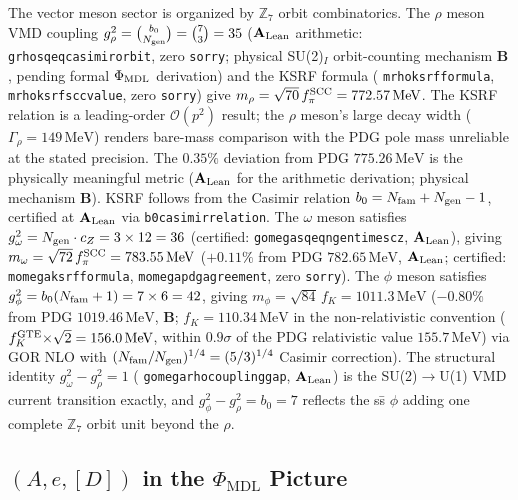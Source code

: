 \documentclass[12pt,letterpaper]{article}
\newcommand{\CatAL}{\ensuremath{\textbf{A}_{\rm Lean}}}
\newcommand{\CatB}{\textbf{B}}
\newcommand{\lean}[1]{%
  \penalty-100
  \begingroup\def\_{\textunderscore\allowbreak}\texttt{#1}\endgroup}
\begin{document}
The vector meson sector is organized by $\mathbb{Z}_7$ orbit combinatorics.
The $\rho$ meson VMD coupling $g_\rho^2 = \binom{b_0}{N_{\rm gen}} = \binom{7}{3} = 35$
($\CatAL$ arithmetic: \lean{g\_rho\_sq\_eq\_casimir\_orbit}, zero \texttt{sorry};
physical SU(2)$_I$ orbit-counting mechanism $\CatB$, pending formal $\Phi_{\rm MDL}$
derivation) and the KSRF formula (\lean{m\_rho\_ksrf\_formula},
\lean{m\_rho\_ksrf\_scc\_value}, zero \texttt{sorry}) give
$m_\rho = \sqrt{70}\,f_\pi^{\rm SCC} = 772.57\,\mathrm{MeV}$.
The KSRF relation is a leading-order $\mathcal{O}(p^2)$ result; the $\rho$ meson's
large decay width ($\Gamma_\rho = 149\,\mathrm{MeV}$) renders bare-mass comparison
with the PDG pole mass unreliable at the stated precision.
The $0.35\%$ deviation from PDG $775.26\,\mathrm{MeV}$ is the physically
meaningful metric ($\CatAL$ for the arithmetic derivation; physical mechanism $\CatB$).
KSRF follows from the Casimir relation $b_0 = N_{\rm fam} + N_{\rm gen} - 1$,
certified at $\CatAL$ via \lean{b0\_casimir\_relation}.
The $\omega$ meson satisfies $g_\omega^2 = N_{\rm gen} \cdot c_Z = 3 \times 12 = 36$
(certified: \lean{g\_omega\_sq\_eq\_ngen\_times\_cz}, $\CatAL$), giving
$m_\omega = \sqrt{72}\,f_\pi^{\rm SCC} = 783.55\,\mathrm{MeV}$ ($+0.11\%$ from PDG
$782.65\,\mathrm{MeV}$, $\CatAL$; certified: \lean{m\_omega\_ksrf\_formula},
\lean{m\_omega\_pdg\_agreement}, zero \texttt{sorry}).
The $\phi$ meson satisfies $g_\phi^2 = b_0(N_{\rm fam}+1) = 7 \times 6 = 42$,
giving $m_\phi = \sqrt{84}\,f_K = 1011.3\,\mathrm{MeV}$ ($-0.80\%$ from PDG
$1019.46\,\mathrm{MeV}$, $\CatB$; $f_K = 110.34\,\mathrm{MeV}$ in the non-relativistic convention
($f_K^{\rm GTE}{\times}\sqrt{2} = 156.0\,\mathrm{MeV}$, within $0.9\sigma$ of the
PDG relativistic value $155.7\,\mathrm{MeV}$) via GOR
NLO with $(N_{\rm fam}/N_{\rm gen})^{1/4} = (5/3)^{1/4}$ Casimir correction).
The structural identity $g_\omega^2 - g_\rho^2 = 1$ (\lean{g\_omega\_rho\_coupling\_gap}, $\CatAL$) is the SU(2)$\to$U(1) VMD
current transition exactly, and $g_\phi^2 - g_\rho^2 = b_0 = 7$ reflects the ss\={}
$\phi$ adding one complete $\mathbb{Z}_7$ orbit unit beyond the $\rho$.

\subsection{\texorpdfstring{$(A, e, [D])$}{(A, e, [D])} in the \texorpdfstring{$\Phi_{\mathrm{MDL}}$}{Phi\_MDL} Picture}
\label{sec:phimdl-triple}
\end{document}
